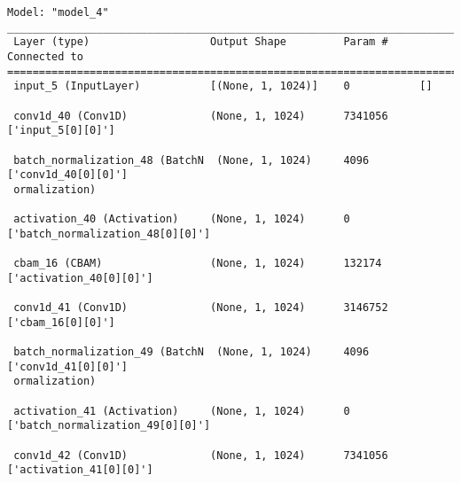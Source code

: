 \begin{lstlisting}
Model: "model_4"
__________________________________________________________________________________________________
 Layer (type)                   Output Shape         Param #     Connected to                     
==================================================================================================
 input_5 (InputLayer)           [(None, 1, 1024)]    0           []                               
                                                                                                  
 conv1d_40 (Conv1D)             (None, 1, 1024)      7341056     ['input_5[0][0]']                
                                                                                                  
 batch_normalization_48 (BatchN  (None, 1, 1024)     4096        ['conv1d_40[0][0]']              
 ormalization)                                                                                    
                                                                                                  
 activation_40 (Activation)     (None, 1, 1024)      0           ['batch_normalization_48[0][0]'] 
                                                                                                  
 cbam_16 (CBAM)                 (None, 1, 1024)      132174      ['activation_40[0][0]']          
                                                                                                  
 conv1d_41 (Conv1D)             (None, 1, 1024)      3146752     ['cbam_16[0][0]']                
                                                                                                  
 batch_normalization_49 (BatchN  (None, 1, 1024)     4096        ['conv1d_41[0][0]']              
 ormalization)                                                                                    
                                                                                                  
 activation_41 (Activation)     (None, 1, 1024)      0           ['batch_normalization_49[0][0]'] 
                                                                                                  
 conv1d_42 (Conv1D)             (None, 1, 1024)      7341056     ['activation_41[0][0]']          
                                                                                                  

\end{lstlisting}
